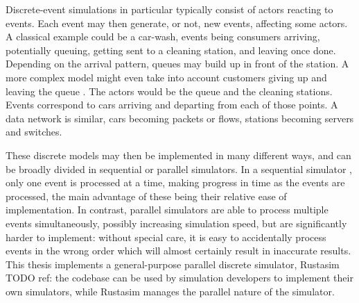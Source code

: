 Discrete-event simulations in particular typically consist of actors reacting to events.
Each event may then generate, or not,  new events, affecting some actors.
A classical example could be a car-wash, events being consumers arriving, potentially queuing, getting sent to a cleaning station, and leaving once done.
Depending on the arrival pattern, queues may build up in front of the station.  A more complex model might even take into account customers giving up and leaving the queue \cite{chandy_distributed_1979}.
The actors would be the queue and the cleaning stations.
Events correspond to cars arriving and departing from each of those points.
A data network is similar, cars becoming packets or flows, stations becoming servers and switches.

These discrete models may then be implemented in many different ways, and can be broadly divided in sequential or parallel simulators.
In a sequential simulator , only one event is processed at a time, making progress in time as the events are processed, the main advantage of these being their relative ease of implementation.
In contrast, parallel simulators  are able to process multiple events simultaneously, possibly increasing simulation speed, but are significantly harder to implement: without special care, it is easy to accidentally process events in the wrong order which will almost certainly result in inaccurate results.
This thesis implements a general-purpose parallel discrete simulator, Rustasim TODO ref:  the codebase can be used by simulation developers to implement their own simulators, while Rustasim manages the parallel nature of the simulator.

